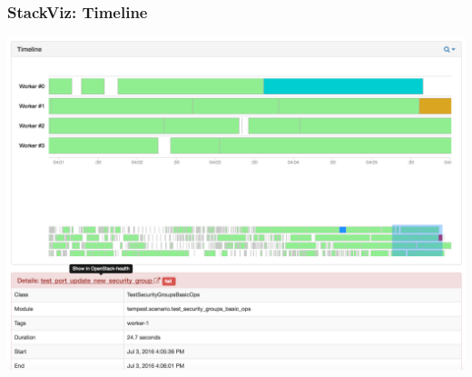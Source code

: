 \documentclass[aspectratio=169,11pt,hyperref={colorlinks=true}]{beamer}
\begin{document}
\begin{frame}
  \frametitle{StackViz: Timeline}
  \begin{center}
  \includegraphics[width=1.1\textheight]{stackviz-sample-timeline.png}
  \end{center}
\end{frame}
\end{document}
